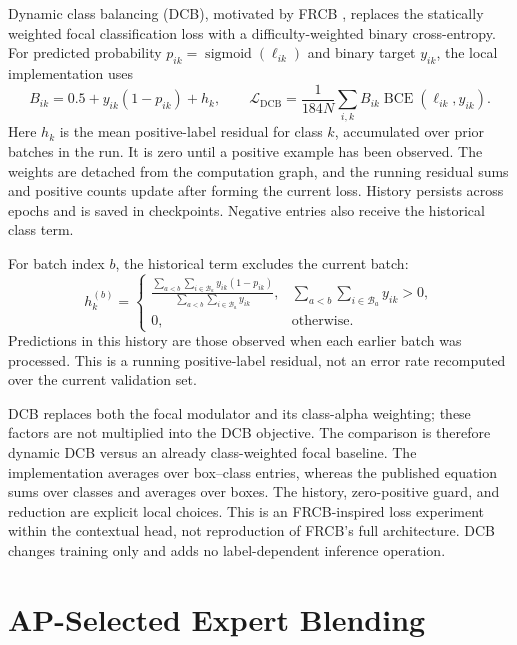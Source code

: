 Dynamic class balancing (DCB), motivated by FRCB \cite{frcb}, replaces the statically weighted focal classification loss with a difficulty-weighted binary cross-entropy. For predicted probability \(p_{ik}=\operatorname{sigmoid}(\ell_{ik})\) and binary target \(y_{ik}\), the local implementation uses
\begin{equation}\label{eq:dcb}
 B_{ik}=0.5+y_{ik}(1-p_{ik})+h_k,\qquad
 \mathcal{L}_{\mathrm{DCB}}=\frac{1}{184N}\sum_{i,k}B_{ik}\operatorname{BCE}(\ell_{ik},y_{ik}).
\end{equation}
Here \(h_k\) is the mean positive-label residual for class \(k\), accumulated over prior batches in the run. It is zero until a positive example has been observed. The weights are detached from the computation graph, and the running residual sums and positive counts update after forming the current loss. History persists across epochs and is saved in checkpoints. Negative entries also receive the historical class term.

For batch index \(b\), the historical term excludes the current batch:
\begin{equation}\label{eq:dcb-history}
 h_k^{(b)}=\begin{cases}
 \displaystyle\frac{\sum_{a<b}\sum_{i\in\mathcal B_a}y_{ik}(1-p_{ik})}
 {\sum_{a<b}\sum_{i\in\mathcal B_a}y_{ik}}, & \displaystyle\sum_{a<b}\sum_{i\in\mathcal B_a}y_{ik}>0,\\[6pt]
 0, & \text{otherwise}.
 \end{cases}
\end{equation}
Predictions in this history are those observed when each earlier batch was processed. This is a running positive-label residual, not an error rate recomputed over the current validation set.

DCB replaces both the focal modulator and its class-alpha weighting; these factors are not multiplied into the DCB objective. The comparison is therefore dynamic DCB versus an already class-weighted focal baseline. The implementation averages over box--class entries, whereas the published equation sums over classes and averages over boxes. The history, zero-positive guard, and reduction are explicit local choices. This is an FRCB-inspired loss experiment within the contextual head, not reproduction of FRCB's full architecture. DCB changes training only and adds no label-dependent inference operation.

\section{AP-Selected Expert Blending}

